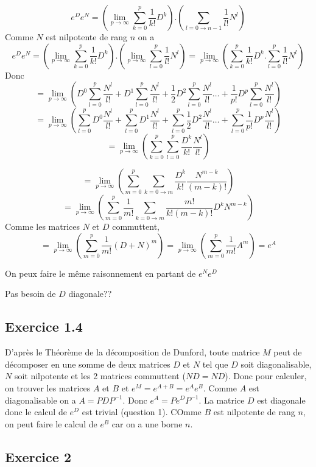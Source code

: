 \documentclass[]{book}
\theoremstyle{definition}
\begin{document}
$$
e^De^N = \left(\lim_{p \to \infty}\sum_{k = 0}^{p}{\frac{1}{k!}D^k}\right) . \left( \sum_{l = 0 \to n-1}{\frac{1}{l!}N^l}\right)
$$
Comme $N$ est nilpotente de rang $n$ on a 
$$
e^De^N = \left(\lim_{p \to \infty}\sum_{k = 0}^{p}{\frac{1}{k!}D^k}\right) . \left( \lim_{p \to \infty}\sum_{l = 0}^{p}{\frac{1}{l!}N^l}\right) = \lim_{p \to \infty}\left( \sum_{k = 0}^{p}{\frac{1}{k!}D^k} . \sum_{l = 0}^{p}{\frac{1}{l!}N^l}\right)
$$
Donc
$$
= \lim_{p \to \infty}\left( D^0\sum_{l = 0 }^{p}{\frac{N^{l}}{l!}} + D^1\sum_{l = 0 }^{p}{\frac{N^{l}}{l!}} + \frac{1}{2}D^2\sum_{l = 0 }^{p}{\frac{N^{l}}{l!}} \ldots +  \frac{1}{p!}D^p\sum_{l = 0 }^{p}{\frac{N^{l}}{l!}} \right)
$$
$$
= \lim_{p \to \infty} \left( \sum_{l = 0 }^{p}{D^0\frac{N^{l}}{l!}} + \sum_{l = 0 }^{p}{D^1\frac{N^{l}}{l!}} + \sum_{l = 0 }^{p}{\frac{1}{2}D^2\frac{N^{l}}{l!}} \ldots +  \sum_{l = 0 }^{p}{\frac{1}{p!}D^p\frac{N^{l}}{l!}}\right)
$$
$$
= \lim_{p \to \infty}\left( \sum_{k = 0}^{p}\sum_{l = 0}^{p}{\frac{D^k}{k!}\frac{N^{l}}{l!}} \right)
$$

$$
= \lim_{p \to \infty}\left( \sum_{m = 0}^{p}\sum_{k = 0 \to m}{\frac{D^k}{k!}\frac{N^{m-k}}{(m-k)!}} \right)
$$
$$
= \lim_{p \to \infty}\left( \sum_{m = 0}^{p}\frac{1}{m!}\sum_{k = 0 \to m}{\frac{m!}{k!(m-k)!}D^kN^{m-k}} \right)
$$
Comme les matrices $N$ et $D$ commuttent,
$$
= \lim_{p \to \infty}\left( \sum_{m = 0}^{p}{\frac{1}{m!}(D+N)^m}\right) = \lim_{p \to \infty}\left( \sum_{m = 0}^{p}{\frac{1}{m!}A^m}\right) = e^{A} 
$$

On peux faire le m\^eme raisonnement en partant de $e^Ne^D$

Pas besoin de $D$ diagonale??

\subsection*{Exercice 1.4}
D'apr\`es le Th\'eor\`eme de la d\'ecomposition de Dunford, toute matrice $M$ peut de d\'ecomposer en une somme de deux matrices $D$ et $N$ tel que $D$ soit diagonalisable, $N$ soit nilpotente et les 2 matrices commuttent ($ND = ND$).
Donc pour calculer, on trouver les matrices $A$ et $B$ et $e^M= e^{A+B} = e^Ae^B$. Comme $A$ est diagonalisable on a $A=PDP^{-1}$. Donc $e^A = Pe^DP^{-1}$. La matrice $D$ est diagonale donc le calcul de $e^D$ est trivial (question 1). COmme $B$ est nilpotente de rang $n$, on peut faire le calcul de $e^B$ car on a une borne $n$.

\subsection*{Exercice 2}
\end{document}
